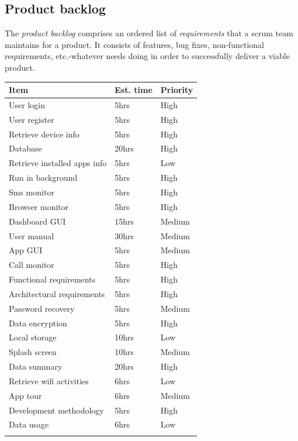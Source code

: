 \documentclass[hidelinks, 12pt, oneside]{article}
\begin{document}
 	\subsection{Product backlog}
 	The \emph{product backlog} comprises an ordered list of \emph{requirements} that a scrum team maintains for a product. It consists of features, bug fixes, non-functional 
 	requirements, etc.-whatever needs doing in order to successfully deliver a viable product.\newline\newline 	
 	\begin{tabular}{|p{6cm}|p{4cm}|p{3cm}|}
			\textbf{Item} & \textbf{Est. time} & \textbf{Priority}\\
			\hline
			User login & 5hrs & High\\
			\hline
			User register & 5hrs & High\\
			\hline
			Retrieve device info & 5hrs & High\\
			\hline
			Database & 20hrs & High\\
			\hline
			Retrieve installed apps info & 5hrs & Low\\
			\hline
			Run in background & 5hrs & High\\
			\hline
			Sms monitor & 5hrs & High\\
			\hline
			Browser monitor & 5hrs & High\\
			\hline
			Dashboard GUI & 15hrs & Medium\\
			\hline
			User manual & 30hrs & Medium\\
			\hline
			App GUI & 5hrs & Medium\\
			\hline
			Call monitor & 5hrs & High\\
			\hline
			Functional requirements & 5hrs & High\\
			\hline
			Architectural requirements & 5hrs & High\\
			\hline
			Password recovery & 5hrs & Medium\\
			\hline
			Data encryption & 5hrs & High\\
			\hline
			Local storage & 10hrs & Low\\
			\hline
			Splash screen & 10hrs & Medium\\
			\hline
			Data summary & 20hrs & High\\
			\hline
			Retrieve wifi activities & 6hrs & Low\\
			\hline
			App tour & 6hrs & Medium\\
			\hline
			Development methodology & 5hrs & High\\
			\hline
			Data usage & 6hrs & Low\\
			\hline
			&&\\
			\hline
		\end{tabular}\newpage
		
\end{document}
